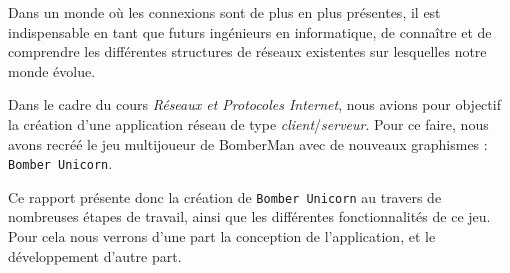 Dans un monde où les connexions sont de plus en plus présentes, il est indispensable en tant que futurs ingénieurs en informatique, de connaître et de comprendre les différentes structures de réseaux existentes sur lesquelles notre monde évolue.

\vspace{0.5cm}

Dans le cadre du cours \textit{Réseaux et Protocoles Internet}, nous avions pour objectif la création d'une application réseau de type \textit{client}/\textit{serveur}. Pour ce faire, nous avons recréé le jeu multijoueur de BomberMan avec de nouveaux graphismes : \texttt{Bomber Unicorn}.

\vspace{0.5cm}

Ce rapport présente donc la création de \texttt{Bomber Unicorn} au travers de nombreuses étapes de travail, ainsi que les différentes fonctionnalités de ce jeu. Pour cela nous verrons d'une part la conception de l'application, et le développement d'autre part. 
